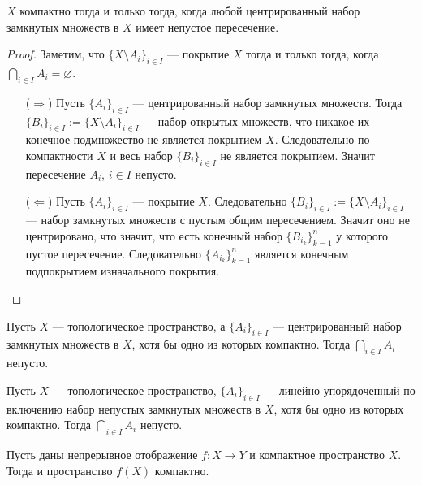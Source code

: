 \documentclass[12pt,a4paper]{article}
\begin{document}
    \begin{theorem}
        $X$ компактно тогда и только тогда, когда любой центрированный набор замкнутых множеств в $X$ имеет непустое пересечение.
    \end{theorem}

    \begin{proof}
        Заметим, что $\{X \setminus A_i\}_{i \in I}$ --- покрытие $X$ тогда и только тогда, когда $\bigcap_{i \in I} A_i = \varnothing$.

        \begin{itemize}
            \item[($\Rightarrow$)] Пусть $\{A_i\}_{i \in I}$ --- центрированный набор замкнутых множеств. Тогда $\{B_i\}_{i \in I} := \{X \setminus A_i\}_{i \in I}$ --- набор открытых множеств, что никакое их конечное подмножество не является покрытием $X$. Следовательно по компактности $X$ и весь набор $\{B_i\}_{i \in I}$ не является покрытием. Значит пересечение $A_i$, $i \in I$ непусто.

            \item[($\Leftarrow$)] Пусть $\{A_i\}_{i \in I}$ --- покрытие $X$. Следовательно $\{B_i\}_{i \in I} := \{X \setminus A_i\}_{i \in I}$ --- набор замкнутых множеств с пустым общим пересечением. Значит оно не центрировано, что значит, что есть конечный набор $\{B_{i_k}\}_{k=1}^n$ у которого пустое пересечение. Следовательно $\{A_{i_k}\}_{k=1}^n$ является конечным подпокрытием изначального покрытия.
        \end{itemize}
    \end{proof}

    \begin{corollary}
        Пусть $X$ --- топологическое пространство, а $\{A_i\}_{i \in I}$ --- центрированный набор замкнутых множеств в $X$, хотя бы одно из которых компактно. Тогда $\bigcap_{i \in I} A_i$ непусто.
    \end{corollary}

    \begin{corollary}
        Пусть $X$ --- топологическое пространство, $\{A_i\}_{i \in I}$ --- линейно упорядоченный по включению набор непустых замкнутых множеств в $X$, хотя бы одно из которых компактно. Тогда $\bigcap_{i \in I} A_i$ непусто.
    \end{corollary}

    \begin{theorem}
        Пусть даны непрерывное отображение $f: X \to Y$ и компактное пространство $X$. Тогда и пространство $f(X)$ компактно.
    \end{theorem}
\end{document}

